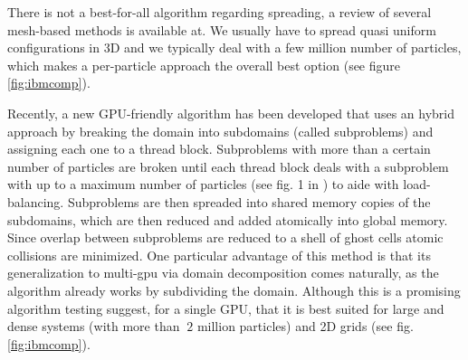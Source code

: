 \documentclass[ twoside,openright,titlepage,numbers=noenddot,%
headinclude,footinclude,cleardoublepage=empty,abstract=on,
BCOR=5mm,paper=a4,fontsize=11pt, dvipsnames
]{scrreprt}
\newcommand{\gpu}{\gls{GPU}\xspace}
\begin{document}
There is not a best-for-all algorithm regarding spreading, a review of several mesh-based methods is available at\cite{Guo2015}.
We usually have to spread quasi uniform configurations in 3D and we typically deal with a few million number of particles, which makes a per-particle approach the overall best option (see figure \ref{fig:ibmcomp}).

Recently, a new \gpu-friendly algorithm has been developed\cite{Shih2021} that uses an hybrid approach by breaking the domain into subdomains (called subproblems) and assigning each one to a thread block. Subproblems with more than a certain number of particles are broken until each thread block deals with a subproblem with up to a maximum number of particles (see fig. 1 in \cite{Shih2021}) to aide with load-balancing. Subproblems are then spreaded into shared memory copies of the subdomains, which are then reduced and added atomically into global memory. Since overlap between subproblems are reduced to a shell of ghost cells atomic collisions are minimized. One particular advantage of this method is that its generalization to multi-gpu via domain decomposition comes naturally, as the algorithm already works by subdividing the domain. Although this is a promising algorithm testing suggest, for a single \gpu, that it is best suited for large and dense systems (with more than $~2$ million particles) and 2D grids (see fig. \ref{fig:ibmcomp}).
\end{document}
